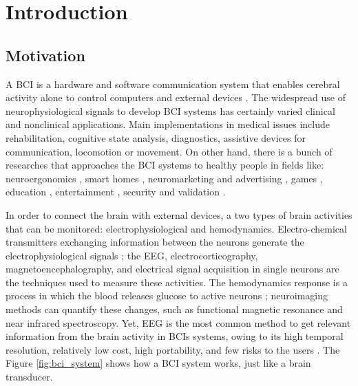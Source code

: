 \chapter{Introduction}\label{ch:introduction}

\section{Motivation}\label{sec:motivation}

A \gls*{BCI} is a hardware and software communication system that enables cerebral activity alone to control computers and external devices \cite{nicolas2012brain}. The widespread use of neurophysiological signals to develop \gls*{BCI} systems has certainly varied clinical and nonclinical applications. Main implementations in medical issues include rehabilitation, cognitive state analysis, diagnostics, assistive devices for communication, locomotion or movement. On other hand, there is a bunch of researches that approaches the \gls*{BCI} systems to healthy people in fields like: neuroergonomics \cite{tremmel2019estimating}, smart homes \cite{maleki2021brain}, neuromarketing and advertising \cite{polat2021eeg}, games \cite{vasiljevic2020brain}, education \cite{taherian2018caregiver}, entertainment \cite{mudgal2020brain}, security and validation \cite{bansal2019eeg}.

In order to connect the brain with external devices, a two types of brain activities that can be monitored: electrophysiological and hemodynamics. Electro-chemical transmitters exchanging information between the neurons generate the electrophysiological signals \cite{baillet2001electromagnetic}; the \gls*{EEG}, electrocorticography, magnetoencephalography, and electrical signal acquisition in single neurons are the techniques used to measure these activities. The hemodynamics response is a process in which the blood releases glucose to active neurons \cite{laureys2009functional}; neuroimaging methods can quantify these changes, such as functional magnetic resonance and near infrared spectroscopy. Yet, \gls*{EEG} is the most common method to get relevant information from the brain activity in \glspl*{BCI} systems, owing to its high temporal resolution, relatively low cost, high portability, and few risks to the users \cite{nicolas-alonso_brain_2012}. The Figure \ref{fig:bci_system} shows how a \gls*{BCI} system works, just like a brain transducer.



